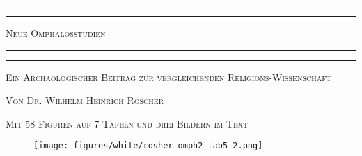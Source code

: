 \documentclass[a4paper, 11pt, oneside]{article}
\begin{document}
\begin{titlepage} %
	\centering %

	
	\rule{\textwidth}{1.6pt}\vspace*{-\baselineskip}\vspace*{2pt} %
	\rule{\textwidth}{0.4pt} %
	
	\vspace{1\baselineskip} %
	
	{\scshape\Huge Neue Omphalosstudien}
	
	\vspace{1\baselineskip} %

	\rule{\textwidth}{0.4pt}\vspace*{-\baselineskip}\vspace{3.2pt} %
	\rule{\textwidth}{1.6pt} %
	
	\vspace{1\baselineskip} %
	
	
	{\scshape Ein Archäologischer Beitrag zur vergleichenden Religions-Wissenschaft} %
	
	\vspace*{1\baselineskip} %

        {\scshape Von \Large Dr. Wilhelm Heinrich Roscher}

	\vspace*{4\baselineskip} %

        {\scshape\small Mit 58 Figuren auf 7 Tafeln und drei Bildern im Text}

	\vspace{1\baselineskip}

        \vspace*{\fill}

        \begin{figure}[H]
        \centering
        \texttt{[image: figures/white/rosher-omph2-tab5-2.png]}
        \end{figure}


\end{titlepage}
\end{document}
